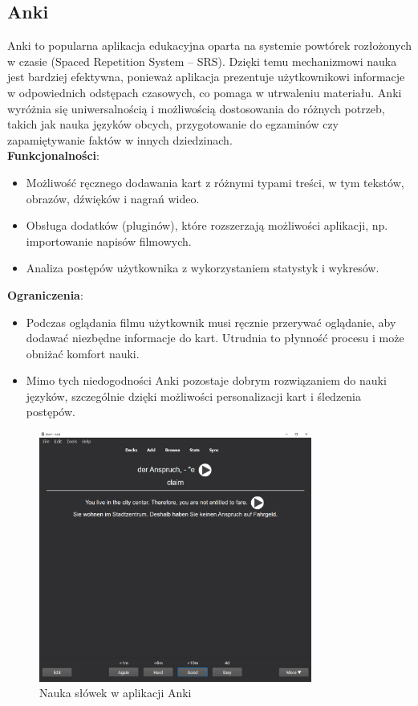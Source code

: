 \subsection{Anki}
Anki to popularna aplikacja edukacyjna oparta na systemie powtórek rozłożonych w czasie (Spaced Repetition System – SRS). Dzięki temu mechanizmowi nauka jest bardziej efektywna, ponieważ aplikacja prezentuje użytkownikowi informacje w odpowiednich odstępach czasowych, co pomaga w utrwaleniu materiału. Anki wyróżnia się uniwersalnością i możliwością dostosowania do różnych potrzeb, takich jak nauka języków obcych, przygotowanie do egzaminów czy zapamiętywanie faktów w innych dziedzinach.\\
\textbf{Funkcjonalności}:
\begin{itemize}
    \item Możliwość ręcznego dodawania kart z różnymi typami treści, w tym tekstów, obrazów, dźwięków i nagrań wideo.
    \item Obsługa dodatków (pluginów), które rozszerzają możliwości aplikacji, np. importowanie napisów filmowych.
    \item Analiza postępów użytkownika z wykorzystaniem statystyk i wykresów.
\end{itemize}
\textbf{Ograniczenia}:
\begin{itemize}
    \item Podczas oglądania filmu użytkownik musi ręcznie przerywać oglądanie, aby dodawać niezbędne informacje do kart. Utrudnia to płynność procesu i może obniżać komfort nauki.
    \item Mimo tych niedogodności Anki pozostaje dobrym rozwiązaniem do nauki języków, szczególnie dzięki możliwości personalizacji kart i śledzenia postępów.
\end{itemize}
\begin{figure}[H]
    \centering
    \includegraphics[width=0.8\textwidth]{IMAGE/Anki.png}
    \caption{Nauka słówek w aplikacji Anki}
    \label{fig:Anki}
\end{figure}
